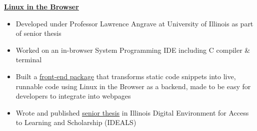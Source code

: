 \documentclass[10pt,a4paper,sans]{moderncv}        %
\begin{document}
\vspace{3pt}
\textbf{\href{http://cs-education.github.io/sys/}{Linux in the Browser}}
\begin{itemize}
  \item Developed under Professor Lawrence Angrave at University of Illinois as part of senior thesis
  \item Worked on an in-browser System Programming IDE including C compiler \& terminal
  \item Built a {\color{blue}\underline{\href{https://cs-education.github.io/elc-dev/}{front-end package}}} that transforms static code snippets into live, runnable
        code using Linux in the Browser as a backend, made to be easy for developers to integrate into
        webpages
  \item Wrote and published {\color{blue}\underline{\href{https://www.ideals.illinois.edu/handle/2142/96030}{senior thesis}}} in Illinois Digital Environment for Access to Learning and Scholarship (IDEALS)
\end{itemize}


% 


\end{document}
